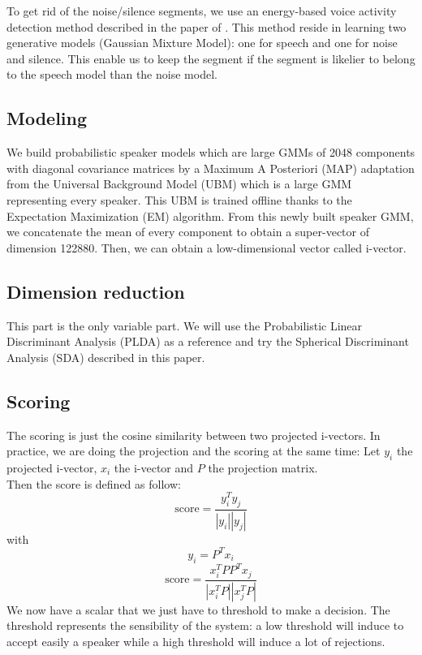 \documentclass{techrep}
\begin{document}
To get rid of the noise/silence segments, we use an energy-based voice
activity detection method described in the paper of \cite{CRIM}.  This
method reside in learning two generative models (Gaussian Mixture
Model): one for speech and one for noise and silence. This enable us
to keep the segment if the segment is likelier to belong to the speech
model than the noise model.

\subsection{Modeling}

We build probabilistic speaker models which are large GMMs of 2048
components with diagonal covariance matrices by a Maximum A Posteriori
(MAP) adaptation from the Universal Background Model (UBM) which is a
large GMM representing every speaker.  This UBM is trained offline
thanks to the Expectation Maximization (EM) algorithm.  From this
newly built speaker GMM, we concatenate the mean of every component to
obtain a super-vector of dimension 122880. Then, we can obtain a
low-dimensional vector called i-vector.

\subsection{Dimension reduction}

This part is the only variable part. We will use the Probabilistic
Linear Discriminant Analysis (PLDA) as a reference and try the
Spherical Discriminant Analysis (SDA) described in this paper.

\subsection{Scoring}

The scoring is just the cosine similarity between two projected i-vectors.
In practice, we are doing the projection and the scoring at the same time:
Let $y_i$ the projected i-vector, $x_i$ the i-vector and $P$ the projection matrix.\\
Then the score is defined as follow:
$$\text{score} = \frac{y_i^Ty_j}{|y_i||y_j|}$$
with
$$y_i = P^Tx_i$$
$$\text{score} = \frac{x_i^TPP^Tx_j}{|x_i^TP||x_j^TP|}$$ We now have a
scalar that we just have to threshold to make a decision.  The
threshold represents the sensibility of the system: a low threshold
will induce to accept easily a speaker while a high threshold will
induce a lot of rejections.
\end{document}
